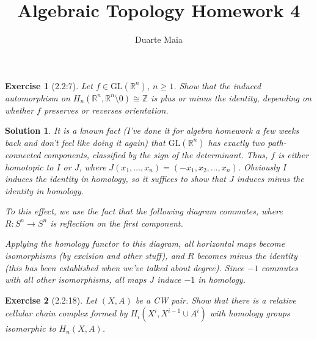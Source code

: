 \documentclass{article}
\title{Algebraic Topology Homework 4}
\author{Duarte Maia}
\theoremstyle{plain}
\newtheorem*{ex}{Exercise}
\theoremstyle{nonumberplain}
\newtheorem{sol}{Solution}
\newcommand{\R}{\mathbb{R}}
\newcommand{\Z}{\mathbb{Z}}
\newcommand{\GL}{\mathrm{GL}}
\begin{document}
\maketitle

\begin{ex}[2.2:7]
Let $f \in \GL(\R^n)$, $n \geq 1$. Show that the induced automorphism on $H_n(\R^n, \R^n \setminus 0) \cong \Z$ is plus or minus the identity, depending on whether $f$ preserves or reverses orientation.
\end{ex}

\begin{sol}
It is a known fact (I've done it for algebra homework a few weeks back and don't feel like doing it again) that $\GL(\R^n)$ has exactly two path-connected components, classified by the sign of the determinant. Thus, $f$ is either homotopic to $I$ or $J$, where $J(x_1, \dots, x_n) = (-x_1, x_2, \dots, x_n)$. Obviously $I$ induces the identity in homology, so it suffices to show that $J$ induces minus the identity in homology.

To this effect, we use the fact that the following diagram commutes, where $R \colon S^n \to S^n$ is reflection on the first component.
\begin{figure}[H]
\centering
{}
\end{figure}

Applying the homology functor to this diagram, all horizontal maps become isomorphisms (by excision and other stuff), and $R$ becomes minus the identity (this has been established when we've talked about degree). Since $-1$ commutes with all other isomorphisms, all maps $J$ induce $-1$ in homology.
\end{sol}

\begin{ex}[2.2:18]
Let $(X,A)$ be a CW pair. Show that there is a relative cellular chain complex formed by $H_i(X^i, X^{i-1} \cup A^i)$ with homology groups isomorphic to $H_n(X,A)$.
\end{ex}
\end{document}
